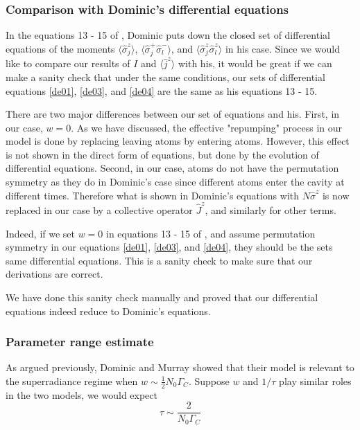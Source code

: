 \documentclass{article}
\newcommand{\gc}{\Gamma_C}
\begin{document}
\subsubsection{Comparison with Dominic's differential equations}
In the equations 13 - 15 of \cite{fluctuationSSS}, Dominic puts down the closed set of differential equations of the moments $\langle\hat{\sigma}^z_j\rangle$, $\langle\hat{\sigma}^+_j\hat{\sigma}^-_l\rangle$, and $\langle\hat{\sigma}_j^z \hat{\sigma}_l^z\rangle$ in his case. Since we would like to compare our results of $I$ and $\langle \hat{j}^z \rangle$ with his, it would be great if we can make a sanity check that under the same conditions, our sets of differential equations \ref{de01}, \ref{de03}, and \ref{de04} are the same as his equations 13 - 15. 

There are two major differences between our set of equations and his. First, in our case, $w=0$. As we have discussed, the effective "repumping" process in our model is done by replacing leaving atoms by entering atoms. However, this effect is not shown in the direct form of equations, but done by the evolution of differential equations. Second, in our case, atoms do not have the permutation symmetry as they do in Dominic's case since different atoms enter the cavity at different times. Therefore what is shown in Dominic's equations with $N\hat{\sigma}^z$ is now replaced in our case by a collective operator $\hat{J}^z$, and similarly for other terms. 

Indeed, if we set $w=0$ in equations 13 - 15 of \cite{fluctuationSSS}, and assume permutation symmetry in our equations \ref{de01}, \ref{de03}, and \ref{de04}, they should be the sets same differential equations. This is a sanity check to make sure that our derivations are correct.

We have done this sanity check manually and proved that our differential equations indeed reduce to Dominic's equations.


\subsubsection{Parameter range estimate}
As argued previously, Dominic and Murray showed that their model is relevant to the superradiance regime when $w\sim \frac{1}{2}N_0 \gc$. Suppose $w$ and $1/\tau$ play similar roles in the two models, we would expect
\begin{equation}
    \tau \sim \frac{2}{N_0 \gc}
\end{equation}
\end{document}

